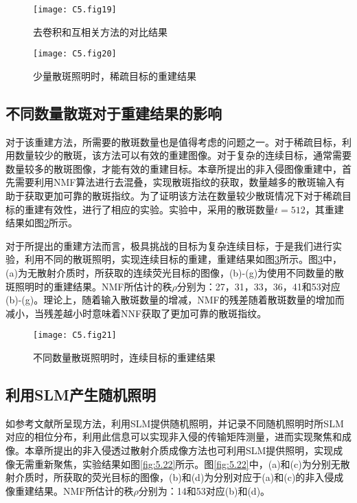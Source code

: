 \begin{figure}[htp]
	\centering
	\texttt{[image: C5.fig19]}
	\caption{去卷积和互相关方法的对比结果}
	\label{fig:5.19}
\end{figure}

\begin{figure}[htp]
	\centering
	\texttt{[image: C5.fig20]}
	\caption{少量散斑照明时，稀疏目标的重建结果}
	\label{fig:5.20}
\end{figure}

\subsection{不同数量散斑对于重建结果的影响}

对于该重建方法，所需要的散斑数量也是值得考虑的问题之一。对于稀疏目标，利用数量较少的散斑，该方法可以有效的重建图像。对于复杂的连续目标，通常需要数量较多的散斑图像，才能有效的重建目标。本章所提出的非入侵图像重建中，首先需要利用NMF算法进行去混叠，实现散斑指纹的获取，数量越多的散斑输入有助于获取更加可靠的散斑指纹。为了证明该方法在数量较少散斑情况下对于稀疏目标的重建有效性，进行了相应的实验。实验中，采用的散斑数量$t = 512$，其重建结果如图\ref{fig:5.20}所示。

对于所提出的重建方法而言，极具挑战的目标为复杂连续目标，于是我们进行实验，利用不同的散斑照明，实现连续目标的重建，重建结果如图\ref{fig:5.21}所示。图\ref{fig:5.21}中，(a)为无散射介质时，所获取的连续荧光目标的图像，(b)-(g)为使用不同数量的散斑照明时的重建结果。NMF所估计的秩$\rho$分别为：27，31，33，36，41和53对应(b)-(g)。理论上，随着输入散斑数量的增减，NMF的残差随着散斑数量的增加而减小，当残差越小时意味着NNF获取了更加可靠的散斑指纹。

\begin{figure}[htp]
	\centering
	\texttt{[image: C5.fig21]}
	\caption{不同数量散斑照明时，连续目标的重建结果}
	\label{fig:5.21}
\end{figure}

\subsection{利用SLM产生随机照明}

如参考文献\cite{boniface_non_invasive_2020}所呈现方法，利用SLM提供随机照明，并记录不同随机照明时所SLM对应的相位分布，利用此信息可以实现非入侵的传输矩阵测量，进而实现聚焦和成像。本章所提出的非入侵透过散射介质成像方法也可利用SLM提供照明，实现成像无需重新聚焦，实验结果如图\ref{fig:5.22}所示。图\ref{fig:5.22}中，(a)和(c)为分别无散射介质时，所获取的荧光目标的图像，(b)和(d)为分别对应于(a)和(c)的非入侵成像重建结果。NMF所估计的秩$\rho$分别为：14和53对应(b)和(d)。

